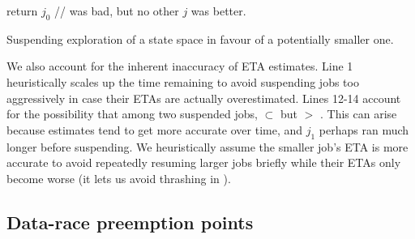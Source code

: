 \begin{algorithm}[t]
	return $j_0$ //  was bad, but no other $j$ was better.
	\caption{Suspending exploration of a state space in favour of a potentially smaller one.}
	\label{alg:shouldworkblock}
\end{algorithm}

%
We also account for the inherent inaccuracy of ETA estimates.
Line 1 heuristically scales up the time remaining to avoid suspending jobs too aggressively
in case their ETAs are actually overestimated.
Lines 12-14 account for the
possibility that among two suspended jobs,
 $\subset$ 
but
 $>$ .
This can arise because estimates tend to get more accurate over time,
and $j_1$ perhaps ran much longer before suspending.
We heuristically assume the smaller job's ETA is more accurate
to avoid repeatedly resuming larger jobs briefly while their ETAs only become worse
(it lets us avoid thrashing in \quicksand).


\subsection{Data-race preemption points}
\label{sec:classifying}

